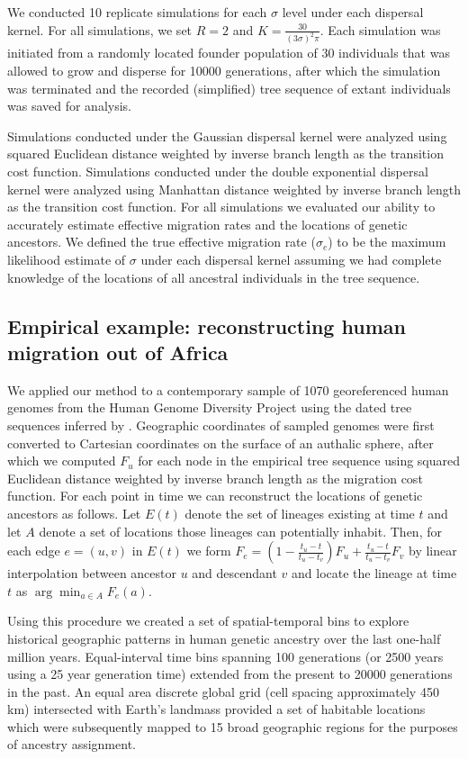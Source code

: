 We conducted 10 replicate simulations for each $\sigma$ level under each 
dispersal kernel. For all simulations, we set $R=2$ and $K=\frac{30}{(3\sigma)^2\pi}$.
Each simulation was initiated from a randomly located founder population of 30
individuals that was allowed to grow and disperse for 10000 generations, 
after which the simulation was terminated and the recorded (simplified) tree
sequence of extant individuals was saved for analysis.

Simulations conducted under the Gaussian dispersal kernel were analyzed using
squared Euclidean distance weighted by inverse branch length as the transition
cost function. Simulations conducted under the double exponential dispersal
kernel were analyzed using Manhattan distance weighted by inverse branch length
as the transition cost function. For all simulations we evaluated our ability
to accurately estimate effective migration rates and the locations of 
genetic ancestors. We defined the true effective migration rate ($\sigma_e$) to 
be the maximum likelihood estimate of $\sigma$ under each dispersal kernel
assuming we had complete knowledge of the locations of all ancestral individuals
in the tree sequence.

\subsection{Empirical example: reconstructing human migration out of Africa}

We applied our method to a contemporary sample of 1070 georeferenced human
genomes from the Human Genome Diversity Project using the dated tree sequences
inferred by \citet{Wohns_etal_2022}. Geographic coordinates of sampled genomes
were first converted to Cartesian coordinates on the surface of an authalic
sphere, after which we computed $F_u$ for each node in the empirical tree sequence
using squared Euclidean distance weighted by inverse branch length as the
migration cost function. For each point in time we can reconstruct the locations
of genetic ancestors as follows. Let $E(t)$ denote the set of lineages existing
at time $t$ and let $A$ denote a set of locations those lineages can potentially
inhabit. Then, for each edge $e = (u, v)$ in $E(t)$ we form 
$F_e = (1 - \frac{t_u - t}{t_u - t_v})F_u + \frac{t_u - t}{t_u - t_v}F_v$
by linear interpolation between ancestor $u$ and descendant $v$ and locate
the lineage at time $t$ as $\arg\min_{a \in A} F_e(a)$.

Using this procedure we created a set of spatial-temporal bins to explore
historical geographic patterns in human genetic ancestry over the last 
one-half million years. Equal-interval time bins spanning 100 generations 
(or 2500 years using a 25 year generation time) extended from the present
to 20000 generations in the past. An equal area discrete global grid 
\citep{Barnes_Sahr_2023} (cell spacing approximately 450 km) intersected with
Earth's landmass provided a set of habitable locations which were subsequently
mapped to 15 broad geographic regions for the purposes of ancestry
assignment.




